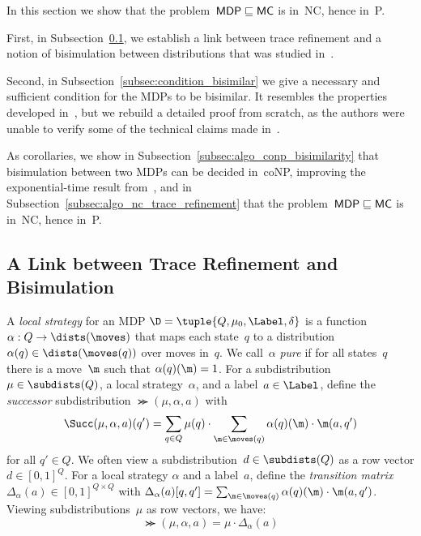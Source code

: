 In this section we show that the problem~${\sf MDP\sqsubseteq MC}$ is in~{\sf NC}, hence in~{\sf P}.

First, in Subsection~\ref{subsec:link-trace-refinement-bisim}, we establish a link between trace refinement and a notion of bisimulation between distributions that was studied in~\cite{Jans}.

Second, in Subsection~\ref{subsec:condition_bisimilar} we give a necessary and sufficient condition for the MDPs to be bisimilar.
It resembles the properties developed in~\cite{Jans}, but we rebuild a detailed proof from scratch, as the authors were unable to verify some of the technical claims made in~\cite{Jans}.

As corollaries, we show in Subsection~\ref{subsec:algo_conp_bisimilarity} that bisimulation between two MDPs can be decided in~{\sf coNP}, improving the exponential-time result from~\cite{Jans},
and in Subsection~\ref{subsec:algo_nc_trace_refinement} that the problem~${\sf MDP\sqsubseteq MC}$ is in~{\sf NC}, hence in~{\sf P}.

\subsection{A Link between Trace Refinement and Bisimulation}\label{subsec:link-trace-refinement-bisim}

A \emph{local strategy} for an MDP $\D = \tuple{Q,\mu_{0},\Label,\delta}$ is a function~$\alpha : Q \to \dists(\moves)$
that maps each state~$q$ to a distribution~$\alpha(q)\in \dists(\moves(q))$ over moves in~$q$.
We call~$\alpha$ \emph{pure} if for all states~$q$ there is a move~$\m$ such that $\alpha(q)(\m) = 1$.
For a subdistribution~$\mu \in \subdists(Q)$, a local strategy~$\alpha$, and a label~$a \in \Label$,
define the \emph{successor} subdistribution $\Succ(\mu, \alpha, a)$ with
\[
\Succ(\mu, \alpha, a)(q')
= \sum_{q \in Q} \mu(q) \cdot \sum_{\m \in \moves(q)} \alpha(q)(\m) \cdot \m(a, q')
\]
for all $q' \in Q$.
We often view a subdistribution~$d \in \subdists(Q)$ as a row vector $d \in {[0,1]}^Q$.
For a local strategy $\alpha$ and a label~$a$,
define the \emph{transition matrix} $\Delta_{\alpha}(a) \in {[0,1]}^{Q \times Q}$ with
$\Delta_{\alpha}(a)[q,q'] = \sum_{\m \in \moves(q)} \alpha(q)(\m) \cdot \m(a, q')$.
Viewing subdistributions~$\mu$ as row vectors, we have:
\begin{equation} \label{eq-Succ-as-prod}
\Succ(\mu, \alpha, a) = \mu \cdot \Delta_{\alpha}(a)
\end{equation}

